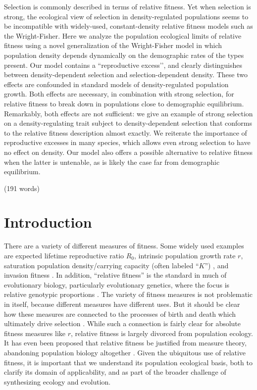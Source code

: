 \documentclass[12pt]{article}
\begin{document}
Selection is commonly described in terms of relative fitness. Yet when selection is strong, the ecological view of selection in density-regulated populations seems to be incompatible with widely-used, constant-density relative fitness models such as the Wright-Fisher. Here we analyze the population ecological limits of relative fitness using a novel generalization of the Wright-Fisher model in which population density depends dynamically on the demographic rates of the types present. Our model contains a ``reproductive excess’’, and clearly distinguishes between density-dependent selection and selection-dependent density. These two effects are confounded in standard models of density-regulated population growth. Both effects are necessary, in combination with strong selection, for relative fitness to break down in populations close to demographic equilibrium. Remarkably, both effects are not sufficient: we give an example of strong selection on a density-regulating trait subject to density-dependent selection that conforms to the relative fitness description almost exactly. We reiterate the importance of reproductive excesses in many species, which allows even strong selection to have no effect on density. Our model also offers a possible alternative to relative fitness when the latter is untenable, as is likely the case far from demographic equilibrium. 

\noindent (191 words)



\newpage{}


\section*{Introduction}

There are a variety of different measures of fitness. Some widely used examples are expected lifetime reproductive ratio $R_0$, intrinsic population growth rate $r$, saturation population density/carrying capacity (often labeled ``$K$'') \citep{benton_2000}, and invasion fitness \citep{metz_1992}. In addition, ``relative fitness'' is the standard in much of evolutionary biology, particularly evolutionary genetics, where the focus is relative genotypic proportions \cite[pp. 468]{barton_2007}. The variety of fitness measures is not problematic in itself, because different measures have different uses. But it should be clear how these measures are connected to the processes of birth and death which ultimately drive selection \citep{metcalf_2007,doebeli_2017}. While such a connection is fairly clear for absolute fitness measures like $r$, relative fitness is largely divorced from population ecology. It has even been proposed that relative fitness be justified from measure theory, abandoning population biology altogether \citep{wagner_2010}. Given the ubiquitous use of relative fitness, it is important that we understand its population ecological basis, both to clarify its domain of applicability, and as part of the broader challenge of synthesizing ecology and evolution.
\end{document}
